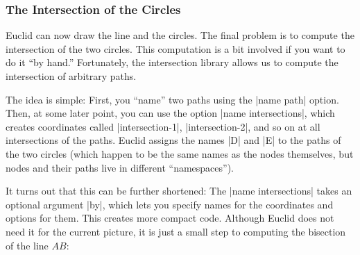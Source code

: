 \begin{codeexample}[]
\end{codeexample}


\subsubsection{The Intersection of the Circles}

Euclid can now draw the line and the circles. The final problem is to
compute the intersection of the two circles. This computation is a bit
involved if you want to do it ``by hand.'' Fortunately, the
intersection library allows us to compute the intersection of
arbitrary paths.

The idea is simple: First, you ``name'' two paths using the
|name path| option. Then, at some later point, you can use the option
|name intersections|, which creates coordinates called
|intersection-1|, |intersection-2|, and so on at all intersections of
the paths. Euclid assigns the names |D| and |E| to the paths of the
two circles (which happen to be the same names as the nodes
themselves, but nodes and their paths live in different
``namespaces''). 
\begin{codeexample}[]
\end{codeexample}

It turns out that this can be further shortened: The
|name intersections| takes an optional argument |by|, which lets you
specify names for the coordinates and options for them. This creates
more compact code. Although Euclid does not need it for the current
picture, it is just a small step to computing the bisection of the line $AB$:

